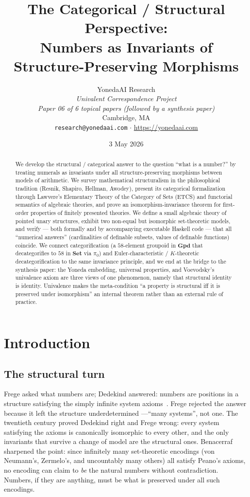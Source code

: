 \documentclass[12pt]{article}
\title{The Categorical / Structural Perspective: \\
Numbers as Invariants of Structure-Preserving Morphisms}
\author{YonedaAI Research \\
\textit{Univalent Correspondence Project} \\
\textit{Paper 06 of 6 topical papers (followed by a synthesis paper)} \\
Cambridge, MA \\
\texttt{research@yonedaai.com} $\cdot$ \url{https://yonedaai.com}}
\date{3 May 2026}
\theoremstyle{definition}
\theoremstyle{remark}
\newcommand{\Set}{\mathbf{Set}}
\newcommand{\Grpd}{\mathbf{Gpd}}
\begin{document}
\maketitle

\begin{abstract}
We develop the structural / categorical answer to the question ``what is a number?'' by treating numerals as invariants under all structure-preserving morphisms between models of arithmetic. We survey mathematical structuralism in the philosophical tradition (Resnik, Shapiro, Hellman, Awodey), present its categorical formalization through Lawvere's Elementary Theory of the Category of Sets (ETCS) and functorial semantics of algebraic theories, and prove an isomorphism-invariance theorem for first-order properties of finitely presented theories. We define a small algebraic theory of pointed unary structures, exhibit two non-equal but isomorphic set-theoretic models, and verify --- both formally and by accompanying executable Haskell code --- that all ``numerical answers'' (cardinalities of definable subsets, values of definable functions) coincide. We connect categorification (a $58$-element groupoid in $\Grpd$ that decategorifies to $58$ in $\Set$ via $\pi_0$) and Euler-characteristic / $K$-theoretic decategorification to the same invariance principle, and we end at the bridge to the synthesis paper: the Yoneda embedding, universal properties, and Voevodsky's univalence axiom are three views of one phenomenon, namely that structural identity is identity. Univalence makes the meta-condition ``a property is structural iff it is preserved under isomorphism'' an internal theorem rather than an external rule of practice.
\end{abstract}

\tableofcontents

\section{Introduction}\label{sec:intro}

\subsection{The structural turn}

Frege asked what numbers are; Dedekind answered: numbers are positions in a structure satisfying the simply infinite system axioms~\cite{Dedekind1888}. Frege rejected the answer because it left the structure underdetermined ---``many systems'', not one. The twentieth century proved Dedekind right and Frege wrong: every system satisfying the axioms is canonically isomorphic to every other, and the only invariants that survive a change of model are the structural ones. Benacerraf~\cite{Benacerraf1965} sharpened the point: since infinitely many set-theoretic encodings (von Neumann's, Zermelo's, and uncountably many others) all satisfy Peano's axioms, no encoding can claim to \emph{be} the natural numbers without contradiction. Numbers, if they are anything, must be what is preserved under all such encodings.
\end{document}
